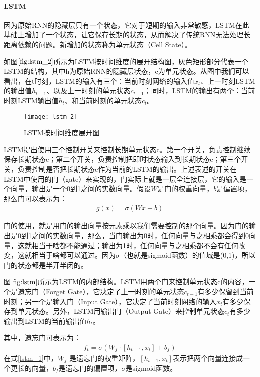  \paragraph{LSTM}
因为原始RNN的隐藏层只有一个状态，它对于短期的输入非常敏感，LSTM在此基础上增加了一个状态，让它保存长期的状态，从而解决了传统RNN无法处理长距离依赖的问题。新增加的状态称为单元状态（Cell State）。

如图$\ref{fig:lstm_2}$所示为LSTM按时间维度的展开结构图，灰色矩形部分代表一个LSTM的结构，其中h为原始RNN的隐藏层状态，c为单元状态。从图中我们可以看出，在t时刻，LSTM的输入有三个：当前时刻网络的输入值$x_{t}$、上一时刻LSTM的输出值$h_{t-1}$、以及上一时刻的单元状态$c_{t-1}$；同时，LSTM的输出有两个：当前时刻LSTM输出值$h_{t}$、和当前时刻的单元状态$c_{t}$。

\begin{figure}[htbp]
\centering
\texttt{[image: lstm\_2]}
\caption{LSTM按时间维度展开图}
\label{fig:lstm_2}
\end{figure}

LSTM提出使用三个控制开关来控制长期单元状态c。第一个开关，负责控制继续保存长期状态c；第二个开关，负责控制把即时状态输入到长期状态c；第三个开关，负责控制是否把长期状态c作为当前的LSTM的输出。上述表述的开关在LSTM中使用的门（gate）来实现的，门实际上就是一层全连接层，它的输入是一个向量，输出是一个0到1之间的实数向量。假设$W$是门的权重向量，$b$是偏置项，那么门可以表示为：
\begin{displaymath}
\begin{aligned}
g(x)=\sigma (W x+b)
\end{aligned}
\end{displaymath}

门的使用，就是用门的输出向量按元素乘以我们需要控制的那个向量。因为门的输出是0到1之间的实数向量，那么，当门输出为0时，任何向量与之相乘都会得到0向量，这就相当于啥都不能通过；输出为1时，任何向量与之相乘都不会有任何改变，这就相当于啥都可以通过。因为$\sigma$（也就是sigmoid函数）的值域是(0,1)，所以门的状态都是半开半闭的。

图$\ref{fig:lstm}$所示为LSTM的内部结构。LSTM用两个门来控制单元状态c的内容，一个是遗忘门（Forget Gate），它决定了上一时刻的单元状态$c_{t-1}$有多少保留到当前时刻；另一个是输入门（Input Gate），它决定了当前时刻网络的输入$x_{t}$有多少保存到单元状态。另外，LSTM用输出门（Output Gate）来控制单元状态$c_{t}$有多少输出到LSTM的当前输出值$h_{t}$。

其中，遗忘门可表示为：
\begin{equation}
\label{lstm_1}
\begin{aligned}
f_{t}=\sigma (W_{f} \cdot [h_{t-1}, x_{t}]+b_{f})
\end{aligned}
\end{equation}
在式\eqref{lstm_1}中，$W_{f}$ 是遗忘门的权重矩阵，$[h_{t-1}, x_{t}]$表示把两个向量连接成一个更长的向量，$b_{f}$是遗忘门的偏置项，$\sigma$是sigmoid函数。

